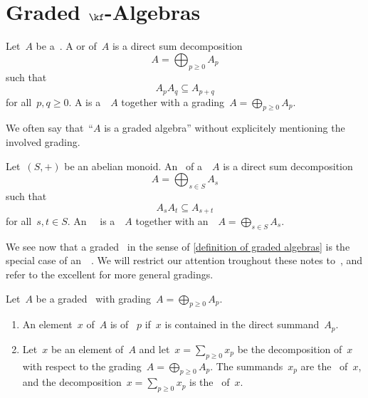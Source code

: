 \section{Graded \texorpdfstring{$\kf$}{k}-Algebras}


\begin{definition}
	\label{definition of graded algebras}
	Let~$A$ be a~\algebra{$\kf$}.
	A  or  of~$A$ is a direct sum decomposition
	\[
		A
		=
		\bigoplus_{p \geq 0} A_p
	\]
	such that
	\[
		A_p A_q
		\subseteq
		A_{p+q}
	\]
	for all~$p, q \geq 0$.
	A  is a~\algebra{$\kf$}~$A$ together with a grading~$A = \bigoplus_{p \geq 0} A_p$.
\end{definition}


\begin{remark}
	We often say that~\enquote{$A$ is a graded algebra} without explicitely mentioning the involved grading.
\end{remark}


\begin{remark}
	Let~$(S, +)$ be an abelian monoid.
	An~ of a~\algebra{$\kf$}~$A$ is a direct sum decomposition
	\[
		A
		=
		\bigoplus_{s \in S}
		A_s
	\]
	such that
	\[
		A_s A_t
		\subseteq
		A_{s + t}
	\]
	for all~$s, t \in S$.
	An~~\algebra{$\kf$} is a~\algebra{$\kf$}~$A$ together with an~~$A = \bigoplus_{s \in S} A_s$.

	We see now that a graded~\algebra{$\kf$} in the sense of \cref{definition of graded algebras} is the special case of an~\graded{$\Natural$}~\algebra{$\kf$}.
	We will restrict our attention troughout these notes to~{\gradings{$\Natural$}}, and refer to the excellent \cite[II.{\S}11, III.{\S}3]{bourbaki_algebra_1} for more general gradings.
\end{remark}


\begin{definition}
	Let~$A$ be a graded~{\algebra{$\kf$}} with grading~$A = \bigoplus_{p \geq 0} A_p$.
	\begin{enumerate}
		\item
			An element~$x$ of~$A$ is  of ~$p$ if~$x$ is contained in the direct summand~$A_p$.
		\item
			Let~$x$ be an element of~$A$ and let~$x = \sum_{p \geq 0} x_p$ be the decomposition of~$x$ with respect to the grading~$A = \bigoplus_{p \geq 0} A_p$.
			The summands~$x_p$ are the~ of~$x$, and the decomposition~$x = \sum_{p \geq 0} x_p$ is the~ of~$x$.
	\end{enumerate}
\end{definition}


